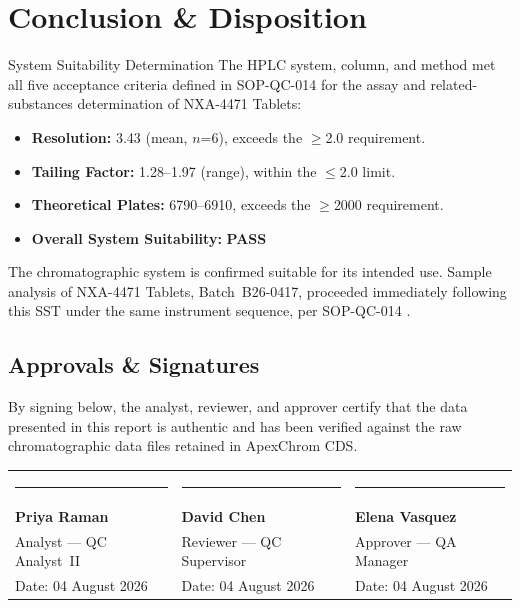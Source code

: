\section{Conclusion \& Disposition}

\begin{qcbox}{System Suitability Determination}
\small
The HPLC system, column, and method met all five acceptance criteria defined in SOP-QC-014 for the assay and related-substances determination of NXA-4471 Tablets:
\begin{itemize}[leftmargin=1.0em,itemsep=1.5pt]
  \item \textbf{Resolution:} 3.43 (mean, $n$=6), exceeds the $\geq$2.0 requirement.
  \item \textbf{Tailing Factor:} 1.28--1.97 (range), within the $\leq$2.0 limit.
  \item \textbf{Theoretical Plates:} 6790--6910, exceeds the $\geq$2000 requirement.
  \item \textbf{Overall System Suitability:} \textcolor{PassGreen}{\textbf{PASS}}
\end{itemize}
\end{qcbox}

\medskip
The chromatographic system is confirmed suitable for its intended use. Sample analysis of NXA-4471 Tablets, Batch~B26-0417, proceeded immediately following this SST under the same instrument sequence, per SOP-QC-014 \cite{ApexSOPQC014}.

\vspace{8pt}
\subsection*{Approvals \& Signatures}
By signing below, the analyst, reviewer, and approver certify that the data presented in this report is authentic and has been verified against the raw chromatographic data files retained in ApexChrom CDS.

\vspace{8pt}
\noindent
\begin{tabularx}{\textwidth}{@{}X X X@{}}
  \rule{4.6cm}{0.6pt} & \rule{4.6cm}{0.6pt} & \rule{4.6cm}{0.6pt} \\
  \textbf{Priya Raman} & \textbf{David Chen} & \textbf{Elena Vasquez} \\
  Analyst --- QC Analyst~II & Reviewer --- QC Supervisor & Approver --- QA Manager \\
  Date: 04 August 2026 & Date: 04 August 2026 & Date: 04 August 2026 \\
\end{tabularx}
